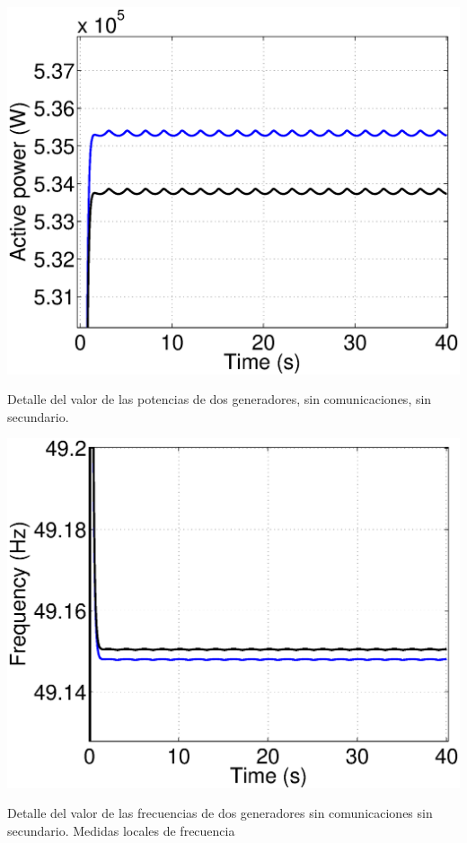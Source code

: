 \documentclass{tufte-handout}
\begin{document}
\begin{marginfigure}%
  \includegraphics[width=\linewidth]{P_no_comm_no_sec}
  \caption{Detalle del valor de las potencias de dos generadores, sin comunicaciones, sin secundario.}
  \label{fig:p_droop_no_sec}
\end{marginfigure}
\begin{marginfigure}%
  \includegraphics[width=\linewidth]{F_no_comm_no_sec}
  \caption{Detalle del valor de las frecuencias de dos generadores sin comunicaciones sin secundario. Medidas locales de frecuencia}
  \label{fig:f_droop_no_sec}
\end{marginfigure}
\end{document}
